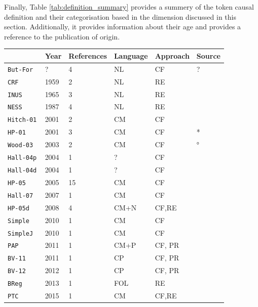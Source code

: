 \documentclass[11pt,a4paper]{book}
\theoremstyle{definition}
\theoremstyle{definition}
\theoremstyle{definition}
\theoremstyle{remark}
\newcommand{\butfor}{\texttt{But-For}\,}
\newcommand{\crf}{\texttt{CRF}\,}
\newcommand{\inus}{\texttt{INUS}\,}
\newcommand{\ness}{\texttt{NESS}\,}
\newcommand{\hitch}{\texttt{Hitch-01}\,}
\newcommand{\hpo}{\texttt{HP-01}\,}
\newcommand{\wood}{\texttt{Wood-03}\,}
\newcommand{\hallp}{\texttt{Hall-04p}\,}
\newcommand{\halld}{\texttt{Hall-04d}\,}
\newcommand{\hpu}{\texttt{HP-05}\,}
\newcommand{\hall}{\texttt{Hall-07}\,}
\newcommand{\hpud}{\texttt{HP-05d}\,}
\newcommand{\simple}{\texttt{Simple}\,}
\newcommand{\simplej}{\texttt{SimpleJ}\,}
\newcommand{\pap}{\texttt{PAP}\,}
\newcommand{\bvo}{\texttt{BV-11}\,}
\newcommand{\bvu}{\texttt{BV-12}\,}
\newcommand{\breg}{\texttt{BReg}\,}
\newcommand{\ptc}{\texttt{PTC}\,}
\begin{document}
Finally, Table \ref{tab:definition_summary} provides a summery of the token causal definition and their categorisation based in the dimension discussed in this section.
Additionally, it provides information about their age and provides a reference to the publication of origin.



\begin{table}
\centering
\scriptsize
\begin{tabular}{llllll}
\toprule
&Year	& References &Language	& Approach & Source\\
\midrule   
\butfor &	 ? &	4 &	 NL &	 CF &	? \\
\crf &	1959 &	2 &	 NL &	 RE &	\parencite{hart1985causation} \\
\inus &	1965 &	3 &	 NL &	 RE &	\parencite{mackie1965causes} \\
\ness &	1987 &	4 &	 NL &	 RE &	\parencite{wright1987causation} \\
\hitch &	2001 &	2 &	 CM &	 CF &	\parencite{hitchcock2001intransitivity} \\
\hpo &	2001 &	3 &	 CM &	 CF &	\parencite{halpern2005causes}* \\
\wood &	2003 &	2 &	 CM &	 CF &	\parencite{woodward2005making}° \\
\hallp &	2004 &	1 &	 ? &	 CF &	\parencite{hall2004two} \\
\halld &	2004 &	1 &	 ? &	 CF &	\parencite{hall2004two} \\
\hpu &	2005 &	15 &	 CM &	 CF &	\parencite{halpern2005causes} \\
\hall &	2007 &	1 &	 CM &	 CF &	\parencite{hall2007structural} \\
\hpud &	2008 &	4 &	 CM+N &	 CF,RE &	\parencite{halpern2008defaults} \\
\simple &	2010 &	1 &	 CM &	 CF &	\parencite{glymour2010actual} \\
\simplej &	2010 &	1 &	 CM &	 CF &	\parencite{glymour2010actual} \\
\pap &	2011 &	1 &	 CM+P &	 CF, PR &	\parencite{twardy2011actual} \\
\bvo &	2011 &	1 &	 CP &	 CF, PR &	\parencite{vennekens2011actual} \\
\bvu &	2012 &	1 &	 CP &	 CF, PR &	\parencite{beckers2012counterfactual} \\
\breg &	2013 &	1 &	 FOL &	 RE &	\parencite{baumgartner2013regularity} \\
\ptc &	2015 &	1 &	 CM &	 CF,RE &	\parencite{weslake2015partial} \\

\end{tabular}
\end{table}
\end{document}
